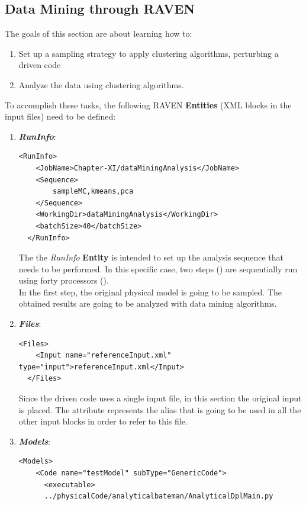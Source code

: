 \subsection{Data Mining through RAVEN}
\label{subsub:DMraven}
The goals of this section are about learning how to:
 \begin{enumerate}
   \item Set up a sampling strategy to apply clustering algorithms, perturbing a driven code
  \item Analyze the data using clustering algorithms.
\end{enumerate}
To accomplish these tasks, the following RAVEN \textbf{Entities} (XML blocks in the input files) need to be defined:
\begin{enumerate}
   \item \textbf{\textit{RunInfo}}:
\begin{lstlisting}[style=XML,morekeywords={arg,extension,pauseAtEnd,overwrite}]
  <RunInfo>
    <JobName>Chapter-XI/dataMiningAnalysis</JobName>
    <Sequence>
        sampleMC,kmeans,pca
    </Sequence>
    <WorkingDir>dataMiningAnalysis</WorkingDir>
    <batchSize>40</batchSize>
  </RunInfo>
\end{lstlisting}
   The the \textit{RunInfo} \textbf{Entity} is intended  to set up the analysis sequence that
   needs to be performed. In this specific case, two steps  () are sequentially run
   using forty processors ().
   \\In the first step, the original physical model is going to be sampled.
   The obtained results are going to be analyzed with data mining
   algorithms.
   \item \textbf{\textit{Files}}:
\begin{lstlisting}[style=XML,morekeywords={arg,extension,pauseAtEnd,overwrite}]
  <Files>
    <Input name="referenceInput.xml" type="input">referenceInput.xml</Input>
  </Files>
\end{lstlisting}
   Since the driven code uses a single input file, in this section the original input is placed. The attribute   represents the alias that is going to be
   used in all the other input blocks in order to refer to this file.
   \item \textbf{\textit{Models}}:
\begin{lstlisting}[style=XML,morekeywords={arg,extension,pauseAtEnd,overwrite}]
  <Models>
    <Code name="testModel" subType="GenericCode">
      <executable>
      ../physicalCode/analyticalbateman/AnalyticalDplMain.py

\end{lstlisting}
\end{enumerate}
